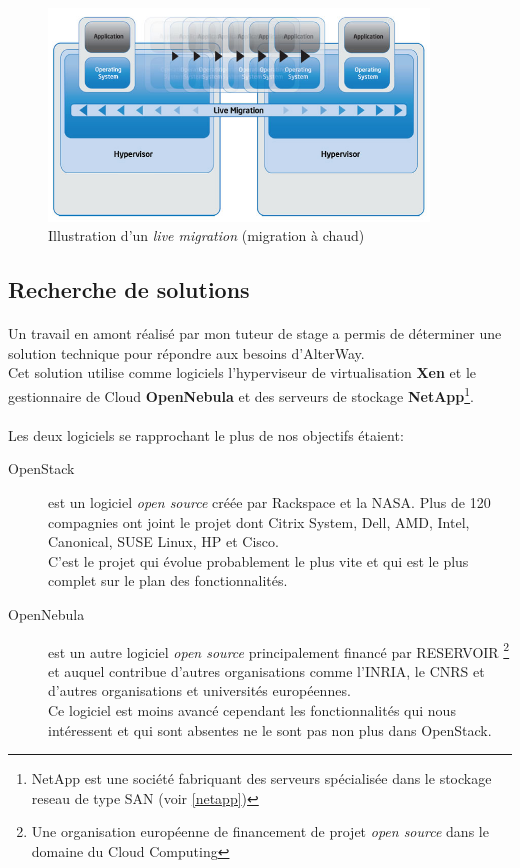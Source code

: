 \begin{figure}[h]
\centering
\includegraphics[width=0.9\textwidth]{resource/img/live-migration}
\caption{Illustration d'un \emph{live migration} (migration à chaud)}
\label{livemigration}
\end{figure}

\subsection{Recherche de solutions}
\paragraph*{}
Un travail en amont réalisé par mon tuteur de stage a permis de déterminer une solution technique pour répondre aux besoins d'AlterWay.\\
Cet solution utilise comme logiciels l'hyperviseur de virtualisation \textbf{Xen} et le gestionnaire de Cloud \textbf{OpenNebula} et des
serveurs de stockage \textbf{NetApp}\footnote{NetApp est une société fabriquant des serveurs spécialisée dans le stockage reseau de type SAN (voir \ref{netapp})}.


\paragraph*{}
Les deux logiciels se rapprochant le plus de nos objectifs étaient:
\begin{description}
	\item[OpenStack]  est un logiciel \emph{open source} créée par Rackspace et la NASA. Plus de 120 compagnies ont joint le projet dont Citrix System, Dell, AMD, Intel,
		Canonical, SUSE Linux, HP et Cisco.\\
		C'est le projet qui évolue probablement le plus vite et qui est le plus complet sur le plan des fonctionnalités.
	\item[OpenNebula]  est un autre logiciel \emph{open source} principalement financé par RESERVOIR
	\footnote{Une organisation européenne de financement de projet \emph{open source} dans le domaine du Cloud Computing} et auquel contribue d'autres organisations
	comme l'INRIA, le CNRS et d'autres organisations et universités européennes.\\
	Ce logiciel est moins avancé cependant les fonctionnalités qui nous intéressent et qui sont absentes ne le sont pas non plus dans OpenStack.
\end{description}


